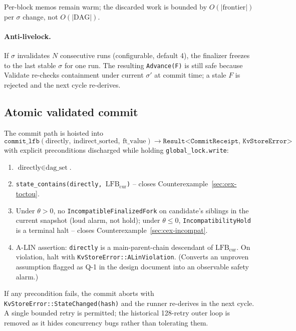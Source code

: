 \documentclass[11pt]{article}
\newcommand{\sigid}{\ensuremath{\sigma}}
\newcommand{\lfbcur}{\ensuremath{\mathrm{LFB}_{\mathrm{cur}}}}
\newcommand{\code}[1]{\texttt{#1}}
\begin{document}
Per-block memos remain warm; the discarded work is bounded by
$O(|\text{frontier}|)$ per $\sigid$ change, not $O(|\text{DAG}|)$.

\paragraph{Anti-livelock.} If $\sigid$ invalidates $N$ consecutive runs
(configurable, default 4), the finalizer freezes to the last stable
$\sigid$ for one run. The resulting \code{Advance(F)} is still safe
because Validate re-checks containment under current $\sigid'$ at
commit time; a stale $F$ is rejected and the next cycle re-derives.

\subsection{Atomic validated commit}
\label{sec:commit}

The commit path is hoisted into
\[
  \code{commit\_lfb}(\text{directly},\ \text{indirect\_sorted},\ \text{ft\_value})
    \to \code{Result<CommitReceipt, KvStoreError>}
\]
with explicit preconditions discharged while holding
\code{global\_lock.write}:
\begin{enumerate}[label=\textbf{P\arabic*.}, leftmargin=2em]
\item $\text{directly} \in \text{dag\_set}$.
\item \code{state\_contains(directly, \lfbcur)} -- closes
Counter\-example~\ref{sec:cex-toctou}.
\item Under $\theta > 0$, no \code{IncompatibleFinalizedFork} on
candidate's siblings in the current snapshot (loud alarm, not hold);
under $\theta \le 0$, \code{IncompatibilityHold} is a terminal halt --
closes Counter\-example~\ref{sec:cex-incompat}.
\item A-LIN assertion: \code{directly} is a main-parent-chain
descendant of \code{\lfbcur}. On violation, halt with
\code{KvStoreError::ALinViolation}. (Converts an unproven assumption
flagged as Q-1 in the design document into an observable safety alarm.)
\end{enumerate}
If any precondition fails, the commit aborts with
\code{KvStoreError::StateChanged(hash)} and the runner re-derives in
the next cycle. A single bounded retry is permitted; the historical
128-retry outer loop is removed as it hides concurrency bugs rather
than tolerating them.
\end{document}
